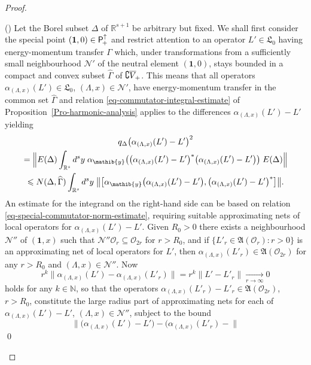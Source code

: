 \documentclass[11pt,twoside,openright]{report}
\theoremstyle{definition}
\theoremstyle{plain}
\theoremstyle{remark}
\theoremstyle{assumption}
\newcommand{\bset}[1]{\bigl\{ #1 \bigr\}}
\newcommand{\bcomm}[2]{\bigl[ #1 , #2 \bigr]}
\newcommand{\norm}[1]{\lVert #1 \rVert}
\newcommand{\bnorm}[1]{\bigl\lVert #1 \bigr\rVert}
\newcommand{\Bnorm}[1]{\Bigl\lVert #1 \Bigr\rVert}
\newcommand{\bqDx}[1]{q_\Delta \bigl( #1 \bigr)}
\newcommand{\Nbb}{\mathbb{N}}
\newcommand{\Lfrak}{\mathfrak{L}}
\newcommand{\yib}{\mathib{y}}
\newcommand{\Nscr}{\mathscr{N}}
\newcommand{\Oscr}{\mathscr{O}}
\newcommand{\unit}{\mathbf{1}}
\newcommand{\Rs}{\mathbb{R}^s}
\newcommand{\Rsone}{\mathbb{R}^{s + 1}}
\newcommand{\Poin}{\mathsf{P}_{\negthinspace +}^\uparrow}
\newcommand{\fwcone}{\overline{V}_{\negthinspace +}}
\newcommand{\ED}{E ( \Delta )}
\newcommand{\aLax}{\alpha_{( \Lambda , x )}}
\newcommand{\AOr}{\mathfrak{A} ( \mathscr{O}_r )}
\newcommand{\AOtwor}{\mathfrak{A} ( \mathscr{O}_{2 r} )}
\newcounter{proofitem}
\newenvironment{prooflist}{\begin{list}{(\roman{proofitem})}%
  {\usecounter{proofitem} \setlength{\topsep}{0ex}%
   \setlength{\parsep}{0.2ex} \setlength{\itemsep}{0.4ex}%
   \setlength{\leftmargin}{0em} \setlength{\itemindent}{0.5em}%
   \setlength{\listparindent}{1em}}}{\qed \end{list}}
\begin{document}
\begin{proof}
\begin{prooflist}
    Let the Borel subset $\Delta$ of $\Rsone$ be arbitrary but
    fixed. We shall first consider the special point $( \unit , 0 ) 
    \in \Poin$ and restrict attention to an operator $L' \in \Lfrak_0$
    having energy-momentum transfer $\Gamma$ which, under
    transformations from a sufficiently small neighbourhood $\Nscr'$
    of the neutral element $( \unit , 0 )$, stays bounded in a compact
    and convex subset $\widehat{\Gamma}$ of $\complement
    \fwcone$. This means that all operators $\aLax ( L' ) \in
    \Lfrak_0$, $( \Lambda , x ) \in \Nscr'$, have energy-momentum
    transfer in the common set $\widehat{\Gamma}$ and relation
    \eqref{eq-commutator-integral-estimate} of 
    Proposition~\ref{Pro-harmonic-analysis} applies to the differences
    $\aLax ( L' ) - L'$ yielding
    \begin{multline}
      \label{eq-applied-harmonic-analysis}
      \bqDx{\aLax ( L' ) - L'}^2 \\
      = \Bnorm{\ED \int_{\Rs} d^s y \; \alpha_\yib \bigl( \bigl( \aLax
      ( L' ) - L' \bigr)^* \bigl( \aLax ( L' ) - L' \bigr) \bigr) \;
      \ED} \\ 
      \leqslant N ( \Delta , \widehat{\Gamma} ) \int_{\Rs} d^s y \;
      \bnorm{\bcomm{\alpha_\yib \bigl( \aLax ( L' ) - L'
      \bigr)}{\bigl( \aLax ( L' ) - L' \bigr)^*}} \text{.}
    \end{multline}
    An estimate for the integrand on the right-hand side can be based
    on relation \eqref{eq-special-commutator-norm-estimate}, requiring
    suitable approximating nets of local operators for $\aLax ( L' ) -
    L'$. Given $R_0 > 0$ there exists a neighbourhood $\Nscr''$ of $(
    \unit ,x )$ such that $\Nscr'' \Oscr_r \subseteq \Oscr_{2r}$ for
    $r > R_0$, and if $\bset{L'_r \in \AOr : r > 0}$ is an
    approximating net of local operators for $L'$, then $\aLax ( L'_r 
    ) \in \AOtwor$ for any $r > R_0$ and $( \Lambda , x ) \in
    \Nscr''$. Now 
    \begin{equation}
      \label{eq-relation-almost-locality}
      r^k \bnorm{\aLax ( L' ) - \aLax ( L'_r )} = r^k \norm{L' - L'_r}
      \xrightarrow[r \rightarrow \infty]{} 0
    \end{equation}
    holds for any $k \in \Nbb$, so that the operators $\aLax ( L'_r )
    - L'_r \in \AOtwor$, $r > R_0$, constitute the large radius part
    of approximating nets for each of $\aLax ( L' ) - L'$, $( \Lambda
    , x ) \in \Nscr''$, subject to the bound
    \begin{equation*}
      \bnorm{\bigl( \aLax ( L' ) - L' \bigr) - \bigl( \aLax ( L'_r ) -
}
\end{equation*}
\end{prooflist}
\end{proof}
\end{document}
